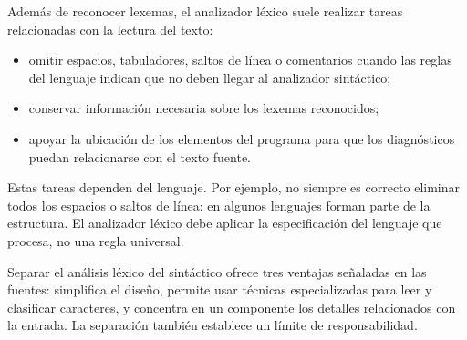 \documentclass[11pt,spanish]{article}
\begin{document}
\begin{center}
\end{center}

Además de reconocer lexemas, el analizador léxico suele realizar tareas relacionadas con la lectura del texto:

\begin{itemize}
    \item omitir espacios, tabuladores, saltos de línea o comentarios cuando las reglas del lenguaje indican que no deben llegar al analizador sintáctico;
    \item conservar información necesaria sobre los lexemas reconocidos;
    \item apoyar la ubicación de los elementos del programa para que los diagnósticos puedan relacionarse con el texto fuente.
\end{itemize}

Estas tareas dependen del lenguaje. Por ejemplo, no siempre es correcto eliminar todos los espacios o saltos de línea: en algunos lenguajes forman parte de la estructura. El analizador léxico debe aplicar la especificación del lenguaje que procesa, no una regla universal.

Separar el análisis léxico del sintáctico ofrece tres ventajas señaladas en las fuentes: simplifica el diseño, permite usar técnicas especializadas para leer y clasificar caracteres, y concentra en un componente los detalles relacionados con la entrada. La separación también establece un límite de responsabilidad.
\end{document}
